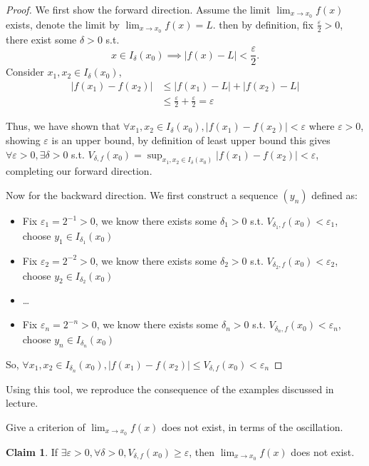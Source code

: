 \documentclass{homework}
\newcommand{\ra}{\rightarrow}
\newcommand{\?}{\stackrel{?}{=}}
\newcommand{\ep}{\varepsilon}
\theoremstyle{definition}
\newtheorem*{claim}{Claim}
\begin{document}
\begin{proof}
    We first show the forward direction. Assume the limit \(\lim_{x\ra x_0} f(x)\) exists, denote the limit by \(\lim_{x\ra x_0} f(x)=L\). then by definition, fix $\frac{\ep}{2}>0$, there exist some $\delta>0$ s.t. \[x\in I_\delta(x_0)\implies |f(x)-L|<\frac{\ep}{2}.\] Consider $x_1, x_2\in I_\delta(x_0)$, \begin{align*}
        |f(x_1)-f(x_2)| &\leq |f(x_1)-L| + |f(x_2)-L|\\
        &\leq \frac{\ep}{2} + \frac{\ep}{2} = \ep
    \end{align*}

    Thus, we have shown that $\forall x_1, x_2\in I_\delta(x_0), |f(x_1)-f(x_2)|<\ep$ where $\ep>0$, showing $\ep$ is an upper bound, by definition of least upper bound this gives $\forall\ep>0, \exists\delta>0$ s.t. $V_{\delta, f}(x_0)=\sup_{x_1,x_2\in I_\delta(x_0)}|f(x_1)-f(x_2)|<\ep$, completing our forward direction.

    Now for the backward direction. We first construct a sequence $(y_n)$ defined as:
    \begin{itemize}
        \item Fix \(\ep_1=2^{-1}>0\), we know there exists some $\delta_1>0$ s.t. $V_{\delta_1, f}(x_0)<\ep_1$, choose $y_1\in I_{\delta_1}(x_0)$
        \item Fix \(\ep_2=2^{-2}>0\), we know there exists some $\delta_2>0$ s.t. $V_{\delta_2, f}(x_0)<\ep_2$, choose $y_2\in I_{\delta_2}(x_0)$
        \item \dots
        \item Fix \(\ep_n=2^{-n}>0\), we know there exists some $\delta_n>0$ s.t. $V_{\delta_n, f}(x_0)<\ep_n$, choose $y_n\in I_{\delta_n}(x_0)$
    \end{itemize} 

    So, \(\forall x_1,x_2\in I_{\delta_n}(x_0), |f(x_1)-f(x_2)|\leq V_{\delta, f}(x_0)<\ep_n\)
\end{proof}

Using this tool, we reproduce the consequence of the examples discussed in lecture. 

\question[3] Give a criterion of \(\lim_{x\ra x_0}f(x)\) does not exist, in terms of the oscillation.

\begin{claim}
    If \(\exists \ep >0, \forall\delta>0, V_{\delta, f}(x_0)\geq \ep\), then $\lim_{x\ra x_0}f(x)$ does not exist. 
\end{claim}
\end{document}
